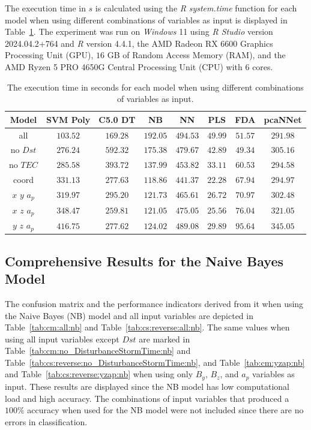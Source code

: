 \documentclass[sn-mathphys-num]{sn-jnl}%
\begin{document}
The execution time in $s$ is calculated using the \textit{R} \textit{system.time} function \cite{system.time2024} for each model when using different combinations of variables as input is displayed in Table~\ref{tab:time:total}. The experiment was run on \textit{Windows} 11 using \textit{R Studio} version 2024.04.2+764 and \textit{R} version 4.4.1, the AMD Radeon RX 6600 Graphics Processing Unit (GPU), $16$ GB of Random Access Memory (RAM), and the AMD Ryzen 5 PRO 4650G Central Processing Unit (CPU) with $6$ cores.

\begin{table}[!ht]
    \centering
    \caption{The execution time in seconds for each model when using different combinations of variables as input.}
	\label{tab:time:total}
	\begin{tabular}{|c|c|c|c|c|c|c|c|}
		\hline
		Model & SVM Poly & C5.0 DT & NB & NN & PLS & FDA & pcaNNet \\ \hline
		all & $103.52$ & $169.28$ & $192.05$ & $494.53$ & $49.99$ & $51.57$ & $291.98$ \\ \hline
		no $Dst$ & $276.24$ & $592.32$ & $175.38$ & $479.67$ & $42.89$ & $49.34$ & $305.16$ \\ \hline
		no $TEC$ & $285.58$ & $393.72$ & $137.99$ & $453.82$ & $33.11$ & $60.53$ & $294.58$ \\ \hline
		coord & $331.13$ & $277.63$ & $118.86$ & $441.37$ & $22.28$ & $67.94$ & $294.97$ \\ \hline
		$x$ $y$ $a_{p}$ & $319.97$ & $295.20$ & $121.73$ & $465.61$ & $26.72$ & $70.97$ & $302.48$ \\ \hline
		$x$ $z$ $a_{p}$ & $348.47$ & $259.81$ & $121.05$ & $475.05$ & $25.56$ & $76.04$ & $321.05$ \\ \hline
		$y$ $z$ $a_{p}$ & $416.75$ & $277.62$ & $124.02$ & $489.08$ & $29.89$ & $95.64$ & $345.05$ \\ \hline
	\end{tabular}
\end{table}

\subsection{Comprehensive Results for the Naive Bayes Model}

The confusion matrix and the performance indicators derived from it when using the Naive Bayes (NB) model and all input variables are depicted in Table~\ref{tab:cm:all:nb} and Table~\ref{tab:cs:reverse:all:nb}. The same values when using all input variables except $Dst$ are marked in Table~\ref{tab:cm:no_DisturbanceStormTime:nb} and Table~\ref{tab:cs:reverse:no_DisturbanceStormTime:nb}, and Table~\ref{tab:cm:yzap:nb} and Table~\ref{tab:cs:reverse:yzap:nb} when using only $B_{y}$, $B_{z}$, and $a_{p}$ variables as input. These results are displayed since the NB model has low computational load and high accuracy. The combinations of input variables that produced a $100\%$ accuracy when used for the NB model were not included since there are no errors in classification.
\end{document}
